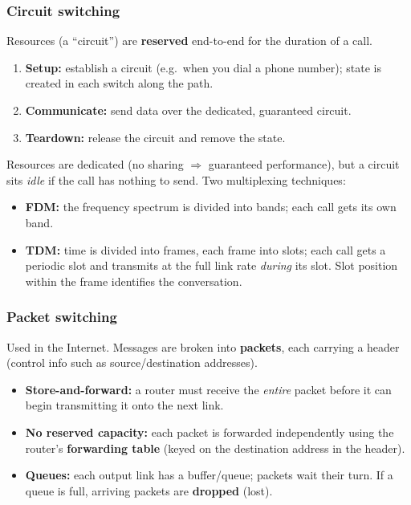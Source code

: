 \documentclass[hidelinks]{article}
\begin{document}
\subsubsection{Circuit switching}
Resources (a ``circuit'') are \textbf{reserved} end-to-end for the duration
of a call.
\begin{enumerate}
    \item \textbf{Setup:} establish a circuit (e.g.\ when you dial a phone
    number); state is created in each switch along the path.
    \item \textbf{Communicate:} send data over the dedicated, guaranteed
    circuit.
    \item \textbf{Teardown:} release the circuit and remove the state.
\end{enumerate}
Resources are dedicated (no sharing $\Rightarrow$ guaranteed performance),
but a circuit sits \emph{idle} if the call has nothing to send. Two
multiplexing techniques:
\begin{itemize}
    \item \textbf{FDM:} the frequency spectrum is divided into bands; each
    call gets its own band.
    \item \textbf{TDM:} time is divided into frames, each frame into slots;
    each call gets a periodic slot and transmits at the full link rate
    \emph{during} its slot. Slot position within the frame identifies the
    conversation.
\end{itemize}

\subsubsection{Packet switching}
Used in the Internet. Messages are broken into \textbf{packets}, each
carrying a header (control info such as source/destination addresses).
\begin{itemize}
    \item \textbf{Store-and-forward:} a router must receive the \emph{entire}
    packet before it can begin transmitting it onto the next link.
    \item \textbf{No reserved capacity:} each packet is forwarded
    independently using the router's \textbf{forwarding table} (keyed on the
    destination address in the header).
    \item \textbf{Queues:} each output link has a buffer/queue; packets wait
    their turn. If a queue is full, arriving packets are \textbf{dropped}
    (lost).
\end{itemize}
\end{document}
